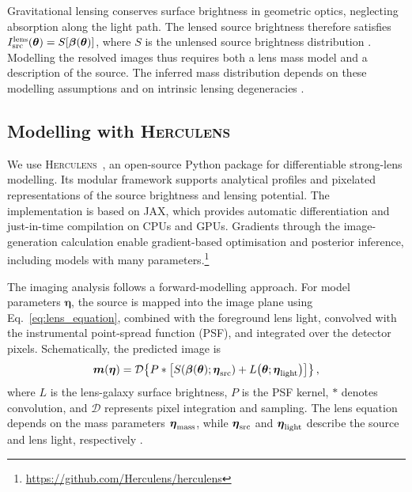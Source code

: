 \documentclass[11pt,a4paper]{article}
\newcommand{\herculens}{\textsc{Herculens}}
\begin{document}
Gravitational lensing conserves surface brightness in geometric optics, neglecting absorption along the light path. The lensed source brightness therefore satisfies $I_{\rm src}^{\rm lens}(\boldsymbol{\theta})=S[\boldsymbol{\beta}(\boldsymbol{\theta})]$, where $S$ is the unlensed source brightness distribution \citep{Saha2024}. Modelling the resolved images thus requires both a lens mass model and a description of the source. The inferred mass distribution depends on these modelling assumptions and on intrinsic lensing degeneracies \citep{Shajib2024}.

\subsection{Modelling with \herculens}
\label{sec:herculens}

We use \herculens\ \citep{Galan2022}, an open-source Python package for differentiable strong-lens modelling. Its modular framework supports analytical profiles and pixelated representations of the source brightness and lensing potential. The implementation is based on JAX, which provides automatic differentiation and just-in-time compilation on CPUs and GPUs. Gradients through the image-generation calculation enable gradient-based optimisation and posterior inference, including models with many parameters.\footnote{\url{https://github.com/Herculens/herculens}}

The imaging analysis follows a forward-modelling approach. For model parameters $\boldsymbol{\eta}$, the source is mapped into the image plane using Eq.~\eqref{eq:lens_equation}, combined with the foreground lens light, convolved with the instrumental point-spread function (PSF), and integrated over the detector pixels. Schematically, the predicted image is
\begin{equation}
    \boldsymbol{m}(\boldsymbol{\eta})
    =\mathcal{D}\!\left\{
        P*\left[
            S\!\left(\boldsymbol{\beta}(\boldsymbol{\theta});\boldsymbol{\eta}_{\rm src}\right)
            +L\!\left(\boldsymbol{\theta};\boldsymbol{\eta}_{\rm light}\right)
        \right]
    \right\},
    \label{eq:forward_model}
\end{equation}
where $L$ is the lens-galaxy surface brightness, $P$ is the PSF kernel, $*$ denotes convolution, and $\mathcal{D}$ represents pixel integration and sampling. The lens equation depends on the mass parameters $\boldsymbol{\eta}_{\rm mass}$, while $\boldsymbol{\eta}_{\rm src}$ and $\boldsymbol{\eta}_{\rm light}$ describe the source and lens light, respectively \citep{Galan2022}.
\end{document}
